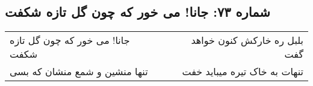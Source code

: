 \begin{center}
\section*{شماره ۷۳: جانا! می خور که چون گل تازه شکفت}
\label{sec:073}
\begin{longtable}{l p{0.5cm} r}
جانا! می خور که چون گل تازه شکفت
&&
بلبل ره خارکش کنون خواهد گفت
\\
تنها منشین و شمع منشان که بسی
&&
تنهات به خاک تیره میباید خفت
\\
\end{longtable}
\end{center}
